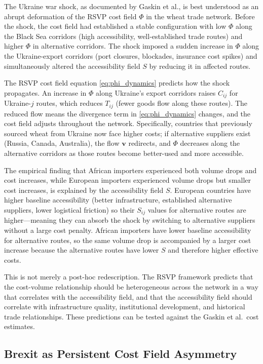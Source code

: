 \documentclass[12pt]{article}
\newcommand{\Tij}{T_{ij}}
\newcommand{\Cij}{C_{ij}}
\begin{document}
The Ukraine war shock, as documented by Gaskin et al., is best understood as an abrupt deformation of the RSVP cost field $\Phi$ in the wheat trade network. Before the shock, the cost field had established a stable configuration with low $\Phi$ along the Black Sea corridors (high accessibility, well-established trade routes) and higher $\Phi$ in alternative corridors. The shock imposed a sudden increase in $\Phi$ along the Ukraine-export corridors (port closures, blockades, insurance cost spikes) and simultaneously altered the accessibility field $S$ by reducing it in affected routes.

The RSVP cost field equation \eqref{eq:phi_dynamics} predicts how the shock propagates. An increase in $\Phi$ along Ukraine's export corridors raises $\Cij$ for Ukraine-$j$ routes, which reduces $\Tij$ (fewer goods flow along these routes). The reduced flow means the divergence term in \eqref{eq:phi_dynamics} changes, and the cost field adjusts throughout the network. Specifically, countries that previously sourced wheat from Ukraine now face higher costs; if alternative suppliers exist (Russia, Canada, Australia), the flow $\mathbf{v}$ redirects, and $\Phi$ decreases along the alternative corridors as those routes become better-used and more accessible.

The empirical finding that African importers experienced both volume drops and cost increases, while European importers experienced volume drops but smaller cost increases, is explained by the accessibility field $S$. European countries have higher baseline accessibility (better infrastructure, established alternative suppliers, lower logistical friction) so their $S_{ij}$ values for alternative routes are higher---meaning they can absorb the shock by switching to alternative suppliers without a large cost penalty. African importers have lower baseline accessibility for alternative routes, so the same volume drop is accompanied by a larger cost increase because the alternative routes have lower $S$ and therefore higher effective costs.

This is not merely a post-hoc redescription. The RSVP framework predicts that the cost-volume relationship should be heterogeneous across the network in a way that correlates with the accessibility field, and that the accessibility field should correlate with infrastructure quality, institutional development, and historical trade relationships. These predictions can be tested against the Gaskin et al.\ cost estimates.

\subsection{Brexit as Persistent Cost Field Asymmetry}
\end{document}
